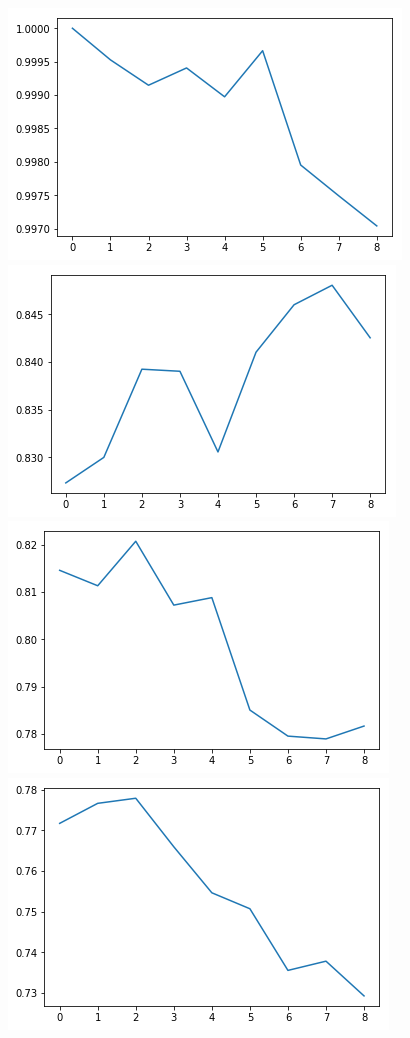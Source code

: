 \begin{figure}[hbt!]
    \centering
    \includegraphics[scale=0.3]{fig/Start_it_1000.png}
    \includegraphics[scale = 0.3]{fig/1000_it_1000.png}
    \includegraphics[scale = 0.3]{fig/2000_it_1000.png}\\
    \includegraphics[scale = 0.3]{fig/3000_it_1000.png}

\end{figure}
